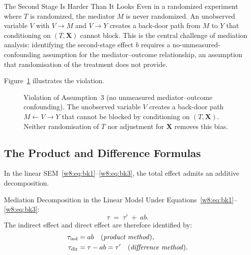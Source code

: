 \documentclass[master.tex]{subfiles}
\begin{document}
\begin{warn}{The Second Stage Is Harder Than It Looks}
Even in a randomized experiment where $T$ is randomized, the mediator
$M$ is never randomized.  An unobserved variable $V$ with $V \to M$
and $V \to Y$ creates a back-door path from $M$ to $Y$ that
conditioning on $(T, \mathbf{X})$ cannot block.  This is the central
challenge of mediation analysis: identifying the second-stage effect
$b$ requires a no-unmeasured-confounding assumption for the
mediator--outcome relationship, an assumption that randomisation of
the treatment does not provide.
\end{warn}

Figure~\ref{w8:fig:bk-violation} illustrates the violation.

\begin{figure}[h]
\centering
{}
\caption{Violation of Assumption~3 (no unmeasured mediator--outcome
confounding).  The unobserved variable $V$ creates a back-door path
$M \leftarrow V \to Y$ that cannot be blocked by conditioning on
$(T, \mathbf{X})$.  Neither randomisation of $T$ nor adjustment for
$\mathbf{X}$ removes this bias.}
\label{w8:fig:bk-violation}
\end{figure}

\subsection{The Product and Difference Formulas}

In the linear SEM~\eqref{w8:eq:bk1}--\eqref{w8:eq:bk3}, the total
effect admits an additive decomposition.

\begin{thm}{Mediation Decomposition in the Linear Model}
\label{w8:prop:decomp}
Under Equations~\eqref{w8:eq:bk1}--\eqref{w8:eq:bk3}:
\begin{equation}
  \tau \;=\; \tau' \;+\; a b.
  \label{w8:eq:linear-decomp}
\end{equation}
The indirect effect and direct effect are therefore identified by:
\begin{align}
  \tau_{\mathrm{ind}} &= ab \quad\text{(\emph{product method})},
  \label{w8:eq:product} \\
  \tau_{\mathrm{dir}} &= \tau - ab = \tau'
    \quad\text{(\emph{difference method})}.
  \label{w8:eq:diff}
\end{align}
\end{thm}
\end{document}
